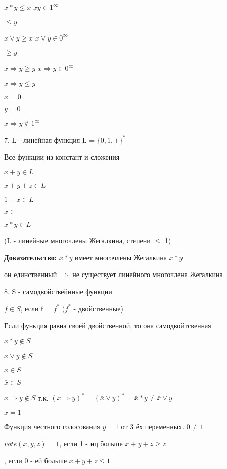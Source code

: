 \documentclass[russian]{lecture-notes}
\begin{document}
    $x*y \leqslant x$ \qquad $xy \in 1^{\infty}$

    \quad $\leqslant y$

    $x \lor y \geqslant x$ \qquad $x \lor y \in 0^{\infty}$

    \quad $\geqslant y$

    $x \Rightarrow y \geqslant y$ \quad $x \Rightarrow y \in 0^{\infty} $

    $x \Rightarrow y \leqslant y $

    \qquad $x=0$

    \qquad $y=0$

    $x \Rightarrow y \notin 1^{\infty}$

    7. L - линейная функция L = $\{0,1,+\}^{*}$

    Все функции из констант и сложения

    $x+y \in L$

    $x+y + z \in L$

    $1+x \in L$

    $\bar{x} \in$

    $x * y \in L$

    (L - линейные многочлены Жегалкина, степени $\leqslant$ 1)

    \textbf{Доказательство: } $ x * y$ имеет многочлены Жегалкина $x*y$

    он единственный $\Rightarrow $ не существует линейного многочлена Жегалкина %

    8. S - самодвойствейнные функции

    $f \in S$, если f = $f^{*}$ \quad ($f^{*} $ - двойственные)

    Если функция равна своей двойственной, то она самодвойтсвенная

    \begin{example}
        $x*y \notin S$

        $x \lor y \notin S$

        $x \in S$

        $\bar{x} \in S$

        $x \Rightarrow y \notin S $ т.к. $(x \Rightarrow y)^{*} = (\bar{x} \lor y)^{*} = \bar{x}*y \neq \bar{x} \lor y$

        $x = 1$
    \end{example}
    Функция честного голосования $y = 1$ от 3 ёх переменных. $0 \neq 1$

    $vote(x,y,z) = 1$,  если 1 - иц больше $x + y + z \geq z$

    \qquad \quad \quad \quad \quad {}, если 0 - ей больше $x + y + z \leq 1$
\end{document}
